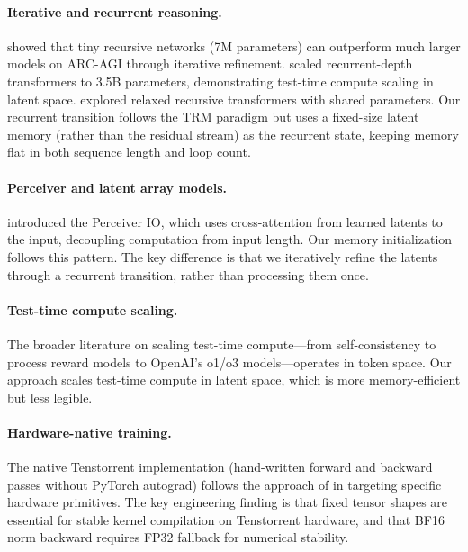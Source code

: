 \documentclass[11pt,a4paper]{article}
\begin{document}
\paragraph{Iterative and recurrent reasoning.}
\citet{jolicoeur2025trm} showed that tiny recursive networks (7M parameters) can outperform much larger models on ARC-AGI through iterative refinement. \citet{geiping2025recurrent} scaled recurrent-depth transformers to 3.5B parameters, demonstrating test-time compute scaling in latent space. \citet{gehring2024relaxed} explored relaxed recursive transformers with shared parameters. Our recurrent transition follows the TRM paradigm but uses a fixed-size latent memory (rather than the residual stream) as the recurrent state, keeping memory flat in both sequence length and loop count.

\paragraph{Perceiver and latent array models.}
\citet{jaegle2022perceiverio} introduced the Perceiver IO, which uses cross-attention from learned latents to the input, decoupling computation from input length. Our memory initialization follows this pattern. The key difference is that we iteratively refine the latents through a recurrent transition, rather than processing them once.

\paragraph{Test-time compute scaling.}
The broader literature on scaling test-time compute---from self-consistency \citep{wang2023selfconsistency} to process reward models \citep{lightman2023prm} to OpenAI's o1/o3 models---operates in token space. Our approach scales test-time compute in latent space, which is more memory-efficient but less legible.

\paragraph{Hardware-native training.}
The native Tenstorrent implementation (hand-written forward and backward passes without PyTorch autograd) follows the approach of \citet{sun2024retention} in targeting specific hardware primitives. The key engineering finding is that fixed tensor shapes are essential for stable kernel compilation on Tenstorrent hardware, and that BF16 norm backward requires FP32 fallback for numerical stability.
\end{document}

